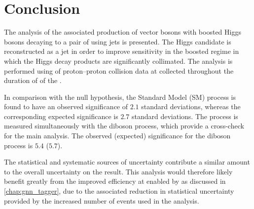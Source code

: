 


\section{Conclusion}

The analysis of the associated production of vector bosons with boosted Higgs bosons decaying to a pair of \bquarks using \largeR jets is presented.
The Higgs candidate is reconstructed as a \largeR jet in order to improve sensitivity in the boosted regime in which the Higgs decay products are significantly collimated.
The analysis is performed using \intlumi of proton--proton collision data at  collected throughout the duration of \runtwo of the \LHC.

In comparison with the null hypothesis, the Standard Model (SM) \VHbb process is found to have an observed significance of $2.1$ standard deviations, whereas the corresponding expected significance is $2.7$ standard deviations.
The \VHbb process is measured simultaneously with the diboson \VZbb process, which provide a cross-check for the main analysis. 
The observed (expected) significance for the diboson process is $5.4$ ($5.7$).

The statistical and systematic sources of uncertainty contribute a similar amount to the overall uncertainty on the result.
This analysis would therefore likely benefit greatly from the improved \btagging efficiency at \highpt enabled by \GNN as discussed in \cref{chap:gnn_tagger}, due to the associated reduction in statistical uncertainty provided by the increased number of events used in the analysis.

